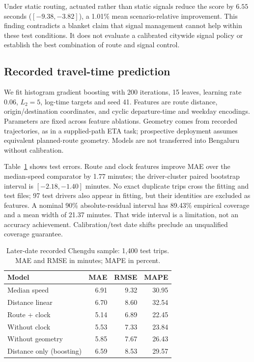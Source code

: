 \documentclass[sigconf,anonymous,review]{acmart}
\begin{document}
Under static routing, actuated rather than static signals reduce the score by $6.55$ seconds ($[-9.38,-3.82]$), a 1.01\% mean scenario-relative improvement. This finding contradicts a blanket claim that signal management cannot help within these test conditions. It does not evaluate a calibrated citywide signal policy or establish the best combination of route and signal control.

\subsection{Recorded travel-time prediction}
We fit histogram gradient boosting with 200 iterations, 15 leaves, learning rate $0.06$, $L_2=5$, log-time targets and seed 41. Features are route distance, origin/destination coordinates, and cyclic departure-time and weekday encodings. Parameters are fixed across feature ablations. Geometry comes from recorded trajectories, as in a supplied-path ETA task; prospective deployment assumes equivalent planned-route geometry. Models are not transferred into Bengaluru without calibration.

Table~\ref{tab:eta} shows test errors. Route and clock features improve MAE over the median-speed comparator by 1.77 minutes; the driver-cluster paired bootstrap interval is $[-2.18,-1.40]$ minutes. No exact duplicate trips cross the fitting and test files; 97 test drivers also appear in fitting, but their identities are excluded as features. A nominal 90\% absolute-residual interval has 89.43\% empirical coverage and a mean width of 21.37 minutes. That wide interval is a limitation, not an accuracy achievement. Calibration/test date shifts preclude an unqualified coverage guarantee.

\begin{table}[t]
\caption{Later-date recorded Chengdu sample: 1,400 test trips. MAE and RMSE in minutes; MAPE in percent.}
\label{tab:eta}
\centering
\begin{tabular}{lrrr}\toprule
Model & MAE & RMSE & MAPE\\\midrule
Median speed & 6.91 & 9.32 & 30.95\\
Distance linear & 6.70 & 8.60 & 32.54\\
Route + clock & 5.14 & 6.89 & 22.45\\
Without clock & 5.53 & 7.33 & 23.84\\
Without geometry & 5.85 & 7.67 & 26.43\\
Distance only (boosting) & 6.59 & 8.53 & 29.57\\\bottomrule
\end{tabular}
\end{table}
\end{document}
